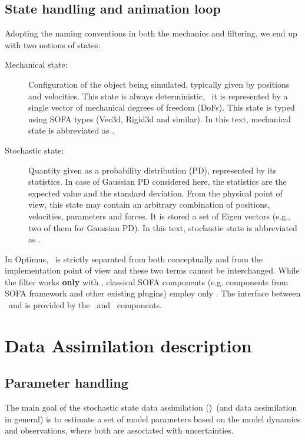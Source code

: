 \documentclass[10pt]{article}
\begin{document}
\subsection{State handling and animation loop}
Adopting the naming conventions in both the mechanics and filtering, we end up with two notions of states:
\begin{description}
	\item[Mechanical state:] Configuration of the object being simulated, typically given by positions and velocities. This state is always deterministic, \ie\, it is represented by a single vector of mechanical degrees of freedom (DoFs). This state is typed using SOFA types (Vec3d, Rigid3d and similar). 
	In this text, mechanical state is abbreviated as \mstate.
	\item[Stochastic state:] Quantity given as a probability distribution (PD), represented by its statistics. In case of Gaussian PD considered here, the statistics are the expected value and the standard deviation. From the physical point of view, this state may contain an arbitrary combination of positions, velocities, parameters and forces. It is stored a set of Eigen vectors (e.g., two of them for Gaussian PD). In this text, stochastic state is abbreviated as \sstate.
\end{description}
In Optimus, \mstate\ is strictly separated from \sstate both conceptually and from the implementation point of view and these two terms cannot be interchanged. While the filter works {\bf only} with \sstate, classical SOFA components (e.g. components from SOFA framework and other existing plugins) employ only \mstate. The interface between \sstate\ and \mstate is provided by the \smw\ and \opr\ components.


\section{Data Assimilation description}


\subsection{Parameter handling}
The main goal of the stochastic state data assimilation (\ssda)\ (and data assimilation in general) is to estimate a set of model parameters based on the model dynamics and observations,
where both are associated with uncertainties.
\end{document}
